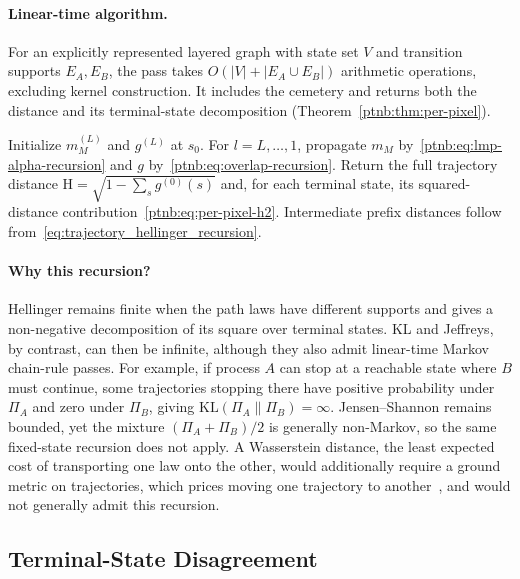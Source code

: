 \paragraph{Linear-time algorithm.}\label{ptnb:sec:lmp-hellinger-backward}

For an explicitly represented layered graph with state set $V$ and transition supports $E_A,E_B$, the pass takes $O(|V|+|E_A\cup E_B|)$ arithmetic operations, excluding kernel construction. It includes the cemetery and returns both the distance and its terminal-state decomposition (Theorem~\ref{ptnb:thm:per-pixel}).

\begin{algorithm}[H]
    \caption{Hellinger backward pass (with per-terminal-state disagreement map)}
    \label{ptnb:alg:hellinger}\label{ptnb:alg:hellinger-backward}
Initialize $m_M^{(L)}$ and $g^{(L)}$ at $s_0$. For $l=L,\ldots,1$, propagate $m_M$ by~\eqref{ptnb:eq:lmp-alpha-recursion} and $g$ by~\eqref{ptnb:eq:overlap-recursion}. Return the full trajectory distance $\mathrm H=\sqrt{1-\sum_sg^{(0)}(s)}$ and, for each terminal state, its squared-distance contribution~\eqref{ptnb:eq:per-pixel-h2}. Intermediate prefix distances follow from~\eqref{eq:trajectory_hellinger_recursion}.

\end{algorithm}

\paragraph{Why this recursion?}
Hellinger remains finite when the path laws have different supports and gives a non-negative decomposition of its square over terminal states. KL and Jeffreys, by contrast, can then be infinite, although they also admit linear-time Markov chain-rule passes. For example, if process $A$ can stop at a reachable state where $B$ must continue, some trajectories stopping there have positive probability under $\Pi_A$ and zero under $\Pi_B$, giving $\mathrm{KL}(\Pi_A\|\Pi_B)=\infty$. Jensen--Shannon remains bounded, yet the mixture $(\Pi_A+\Pi_B)/2$ is generally non-Markov, so the same fixed-state recursion does not apply. A Wasserstein distance, the least expected cost of transporting one law onto the other, would additionally require a ground metric on trajectories, which prices moving one trajectory to another~\parencite{PeyreCuturi2019OptimalTransport}, and would not generally admit this recursion.

\subsection{Terminal-State Disagreement}\label{ptnb:sec:lmp-disagreement}

